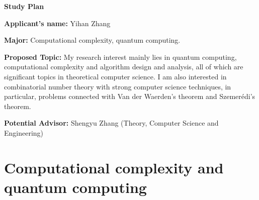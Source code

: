 \documentclass[12pt]{article}
\begin{document}
\thispagestyle{empty}

\bigskip
\bigskip

\centerline{\textbf{\Large{Study Plan}}}

\bigskip
\bigskip

\noindent \textbf{Applicant's name:} %
Yihan Zhang

\bigskip

\noindent \textbf{Major:} %
Computational complexity, quantum computing. 

\bigskip 

\noindent \textbf{Proposed Topic:} %
My research interest mainly lies in quantum computing, computational complexity and algorithm design and analysis, all of which are significant topics in theoretical computer science. I am also interested in combinatorial number theory with strong computer science techniques, in particular, problems connected with Van der Waerden's theorem and Szemer\'{e}di's theorem.

\bigskip





\noindent \textbf{Potential Advisor:} %
Shengyu Zhang (Theory, Computer Science and Engineering)

\bigskip

\section{Computational complexity and quantum computing}
\end{document}
